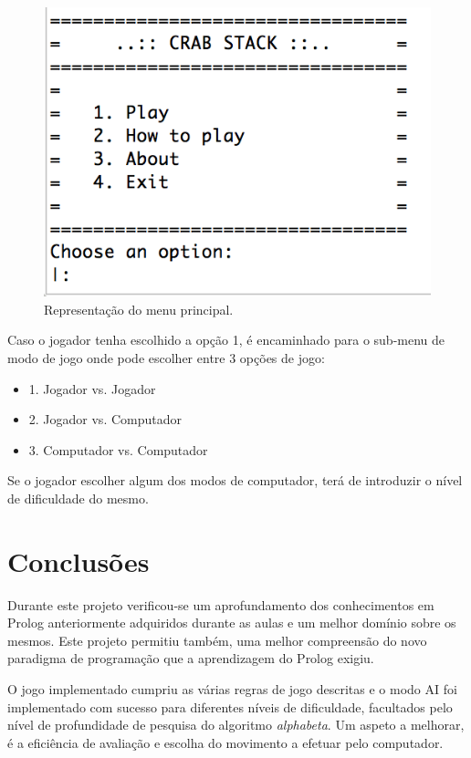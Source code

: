 \documentclass[a4paper]{article}
\begin{document}
\begin{figure}[!ht]
	\begin{center}
	\includegraphics[scale=0.4]{img/main_menu.png}
	\caption{Representação do menu principal.}
    \label{Fig:main_menu}
	\end{center}
\end{figure}

\newpage

Caso o jogador tenha escolhido a opção 1, é encaminhado para o sub-menu de modo de jogo onde pode escolher entre 3 opções de jogo:
\begin{itemize}
\item 1. Jogador vs. Jogador
\item 2. Jogador vs. Computador
\item 3. Computador vs. Computador
\end{itemize}

Se o jogador escolher algum dos modos de computador, terá de introduzir o nível de dificuldade do mesmo.

\section{Conclusões}
Durante este projeto verificou-se um aprofundamento dos conhecimentos em Prolog anteriormente adquiridos durante as aulas e um melhor domínio sobre os mesmos. Este projeto permitiu também, uma melhor compreensão do novo paradigma de programação que a aprendizagem do Prolog exigiu.

O jogo implementado cumpriu as várias regras de jogo descritas e o modo AI foi implementado com sucesso para diferentes níveis de dificuldade, facultados pelo nível de profundidade de pesquisa do algoritmo \textit{alphabeta}. Um aspeto a melhorar, é a eficiência de avaliação e escolha do movimento a efetuar pelo computador.
\end{document}
